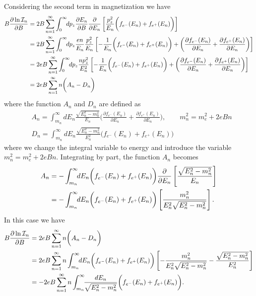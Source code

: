 \documentclass[sn-mathphys,Numbered]{sn-jnl}
\theoremstyle{thmstyleone}%
\theoremstyle{thmstyletwo}%
\theoremstyle{thmstylethree}%
\begin{document}
Considering the second term in magnetization we have
\begin{align}
B\frac{\partial\ln\mathcal{I}_n}{\partial B}&=2B \sum_{n=1}^\infty\int_0^\infty\!\!dp_z \frac{\partial E_n}{\partial B}\frac{\partial}{\partial E_n}\left[\frac{p_z^2}{E_{n}}\bigg(f_{e^-}(E_n)+f_{e^+}(E_n)\bigg)\right]\notag\\
&=2B \sum_{n=1}^\infty\int_0^\infty\!\!dp_z \frac{en}{E_n}\frac{p_z^2}{E_{n}}\left[-\frac{1}{E_{n}}\bigg(f_{e^-}(E_n)+f_{e^+}(E_n)\bigg)+\bigg(\frac{\partial f_{e^-}(E_n)}{\partial E_n}+\frac{\partial f_{e^+}(E_n)}{\partial E_n}\bigg)\right]\notag\\
&=2eB \sum_{n=1}^\infty\int_0^\infty\!\!dp_z \frac{n p_z^2}{E^2_{n}}\left[-\frac{1}{E_{n}}\bigg(f_{e^-}(E_n)+f_{e^+}(E_n)\bigg)+\bigg(\frac{\partial f_{e^-}(E_n)}{\partial E_n}+\frac{\partial f_{e^+}(E_n)}{\partial E_n}\bigg)\right]\notag\\
&=2eB\sum_{n=1}^\infty n\bigg(A_n-D_n\bigg)
\end{align}
where the function $A_n$ and $D_n$ are defined as
\begin{align}
 \label{Function_A}
    &A_n=\int_{m_n}^\infty\!\!dE_n \frac{\sqrt{E^2_n-m^2_n}}{E_{n}}\bigg(\frac{\partial f_{e^-}(E_n)}{\partial E_n}+\frac{\partial f_{e^+}(E_n)}{\partial E_n}\bigg),\qquad m_n^2=m^2_e+2eBn\\ 
    \label{Function_D}
    &D_n=\int_{m_n}^\infty\!\!dE_n \frac{\sqrt{E^2_n-m^2_n}}{E^2_{n}}\bigg(f_{e^-}(E_n)+f_{e^+}(E_n)\bigg)
\end{align}
where we change the integral variable to energy and introduce the variable $m_n^2=m^2_e+2eBn$. Integrating by part, the function $A_n$ becomes
\begin{align}
A_n&=-\int_{m_n}^\infty\!\!dE_n \bigg(f_{e^-}(E_n)+f_{e^+}(E_n)\bigg)\frac{\partial}{\partial E_n}\left[\frac{\sqrt{E^2_n-m^2_n}}{E_{n}}\right]\notag\\
&=-\int_{m_n}^\infty\!\!dE_n \bigg(f_{e^-}(E_n)+f_{e^+}(E_n)\bigg)\left[\frac{m^2_n}{E^2_{n}\sqrt{E^2_n-m^2_n}}\right].
\end{align}
In this case we have
\begin{align}
B\frac{\partial\ln\mathcal{I}_n}{\partial B}&=2eB\sum_{n=1}^\infty n\bigg(A_n-D_n\bigg)\notag\\
&=2eB\sum_{n=1}^\infty n\int_{m_n}^\infty\!\!dE_n \bigg(f_{e^-}(E_n)+f_{e^+}(E_n)\bigg)\left[-\frac{m^2_n}{E^2_{n}\sqrt{E^2_n-m^2_n}}-\frac{\sqrt{E^2_n-m^2_n}}{E^2_{n}}\right]\notag\\
&=-2eB\sum_{n=1}^\infty n\int_{m_n}^\infty\!\!\frac{dE_n}{\sqrt{E^2_n-m^2_n}} \bigg(f_{e^-}(E_n)+f_{e^+}(E_n)\bigg).
\end{align}
\end{document}
